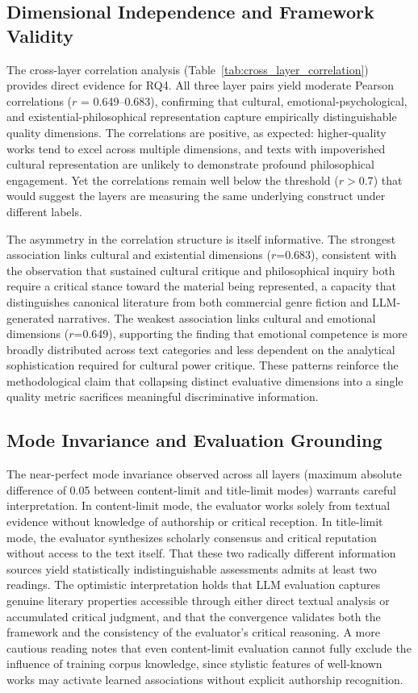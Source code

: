 \subsection{Dimensional Independence and Framework Validity}

The cross-layer correlation analysis (Table~\ref{tab:cross_layer_correlation}) provides direct evidence for RQ4. All three layer pairs yield moderate Pearson correlations ($r$ = 0.649--0.683), confirming that cultural, emotional-psychological, and existential-philosophical representation capture empirically distinguishable quality dimensions. The correlations are positive, as expected: higher-quality works tend to excel across multiple dimensions, and texts with impoverished cultural representation are unlikely to demonstrate profound philosophical engagement. Yet the correlations remain well below the threshold ($r>0.7$) that would suggest the layers are measuring the same underlying construct under different labels.

The asymmetry in the correlation structure is itself informative. The strongest association links cultural and existential dimensions ($r$=0.683), consistent with the observation that sustained cultural critique and philosophical inquiry both require a critical stance toward the material being represented, a capacity that distinguishes canonical literature from both commercial genre fiction and LLM-generated narratives. The weakest association links cultural and emotional dimensions ($r$=0.649), supporting the finding that emotional competence is more broadly distributed across text categories and less dependent on the analytical sophistication required for cultural power critique. These patterns reinforce the methodological claim that collapsing distinct evaluative dimensions into a single quality metric sacrifices meaningful discriminative information.

\subsection{Mode Invariance and Evaluation Grounding}

The near-perfect mode invariance observed across all layers (maximum absolute difference of 0.05 between content-limit and title-limit modes) warrants careful interpretation. In content-limit mode, the evaluator works solely from textual evidence without knowledge of authorship or critical reception. In title-limit mode, the evaluator synthesizes scholarly consensus and critical reputation without access to the text itself. That these two radically different information sources yield statistically indistinguishable assessments admits at least two readings. The optimistic interpretation holds that LLM evaluation captures genuine literary properties accessible through either direct textual analysis or accumulated critical judgment, and that the convergence validates both the framework and the consistency of the evaluator's critical reasoning. A more cautious reading notes that even content-limit evaluation cannot fully exclude the influence of training corpus knowledge, since stylistic features of well-known works may activate learned associations without explicit authorship recognition.

